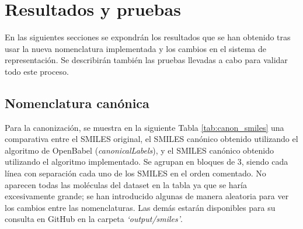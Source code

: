 
\chapter{Resultados y pruebas}

En las siguientes secciones se expondrán los resultados que se han obtenido tras usar la nueva nomenclatura implementada y los cambios en el sistema de representación. Se describirán también las pruebas llevadas a cabo para validar todo este proceso.

\section{Nomenclatura canónica}

Para la canonización, se muestra en la siguiente Tabla \ref{tab:canon_smiles} una comparativa entre el SMILES original, el SMILES canónico obtenido utilizando el algoritmo de OpenBabel (\textit{canonicalLabels}), y el SMILES canónico obtenido utilizando el algoritmo implementado. Se agrupan en bloques de 3, siendo cada línea con separación cada uno de los SMILES en el orden comentado. No aparecen todas las moléculas del dataset en la tabla ya que se haría excesivamente grande; se han introducido algunas de manera aleatoria para ver los cambios entre las nomenclaturas. Las demás estarán disponibles para su consulta en GitHub en la carpeta \textit{`output/smiles'}.

